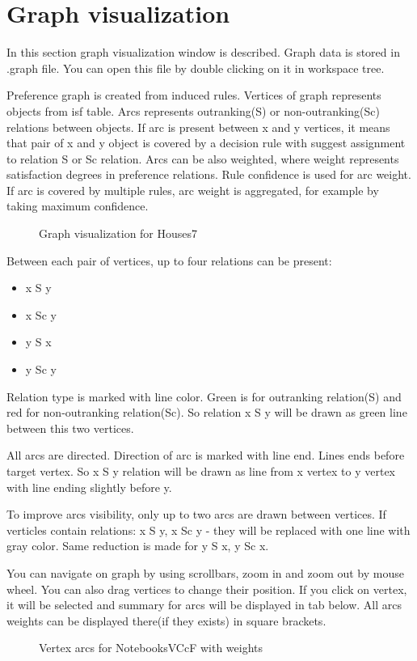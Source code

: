 \section{Graph visualization}\label{section:graph}

In this section graph visualization window is described. Graph data is stored in .graph file. You can open this file by double clicking on it in workspace tree.

Preference graph is created from induced rules. Vertices of graph represents objects from isf table. Arcs represents outranking(S) or non-outranking(Sc) relations between objects. If arc is present between x and y vertices, it means that pair of x and y object is covered by a decision rule with suggest assignment to relation S or Sc relation. Arcs can be also weighted, where weight represents satisfaction degrees in preference relations. Rule confidence is used for arc weight. If arc is covered by multiple rules, arc weight is aggregated, for example by taking maximum confidence.

\begin{figure*}[!ht] 
	\centering
	\caption{Graph visualization for Houses7}
\end{figure*}

Between each pair of vertices, up to four relations can be present:
\begin{itemize}
	\item x S y
	\item x Sc y
	\item y S x
	\item y Sc y
\end{itemize}

Relation type is marked with line color. Green is for outranking relation(S) and red for non-outranking relation(Sc). So relation x S y will be drawn as green line between this two vertices.

All arcs are directed. Direction of arc is marked with line end. Lines ends before target vertex. So x S y relation will be drawn as line from x vertex to y vertex with line ending slightly before y.

To improve arcs visibility, only up to two arcs are drawn between vertices. If verticles contain relations: x S y, x Sc y - they will be replaced with one line with gray color. Same reduction is made for y S x, y Sc x.

You can navigate on graph by using scrollbars, zoom in and zoom out by mouse wheel. You can also drag vertices to change their position. If you click on vertex, it will be selected and summary for arcs will be displayed in tab below. All arcs weights can be displayed there(if they exists) in square brackets.

\begin{figure*}[!ht] 
	\centering
	\caption{Vertex arcs for NotebooksVCcF with weights}
\end{figure*}


\vfill\newpage